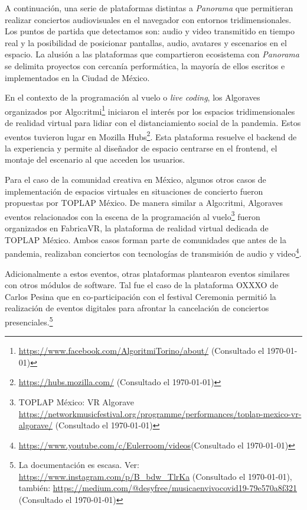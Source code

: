 

A continuación, una serie de plataformas distintas a \textit{Panorama} que permitieran realizar conciertos audiovisuales en el navegador con entornos tridimensionales. Los puntos de partida que detectamos son: audio y video transmitido en tiempo real y la posibilidad de posicionar pantallas, audio, avatares y escenarios en el espacio. La alusión a las plataformas que compartieron ecosistema con \textit{Panorama} se delimita proyectos con cercanía performática, la mayoría de ellos escritos e implementados en la Ciudad de México. 

En el contexto de la programación al vuelo o \textit{live coding}, los Algoraves organizados por Algo:ritmi\footnote{\url{https://www.facebook.com/AlgoritmiTorino/about/} (Consultado el \today)} iniciaron el interés por los espacios tridimensionales de realidad virtual para lidiar con el distanciamiento social de la pandemia. Estos eventos tuvieron lugar en Mozilla Hubs\footnote{\url{https://hubs.mozilla.com/} (Consultado el \today)}. Esta plataforma resuelve el backend de la experiencia y permite al diseñador de espacio centrarse en el frontend, el montaje del escenario al que acceden los usuarios.


Para el caso de la comunidad creativa en México, algunos otros casos de implementación de espacios virtuales en situaciones de concierto fueron propuestas por TOPLAP México. De manera similar a Algo:ritmi, Algoraves eventos relacionados con la escena de la programación al vuelo\footnote{TOPLAP México: VR Algorave \url{https://networkmusicfestival.org/programme/performances/toplap-mexico-vr-algorave/} (Consultado el \today)} fueron organizados en FabricaVR, la plataforma de realidad virtual dedicada de TOPLAP México. Ambos casos forman parte de comunidades que antes de la pandemia, realizaban conciertos con tecnologías de transmisión de audio y video\footnote{\url{https://www.youtube.com/c/Eulerroom/videos}(Consultado el \today)}.%

Adicionalmente a estos eventos, otras plataformas plantearon eventos similares con otros módulos de software. Tal fue el caso de la plataforma OXXXO de Carlos Pesina que en co-participación con el festival Ceremonia permitió la realización de eventos digitales para afrontar la cancelación de conciertos presenciales.\footnote{La documentación es escasa. Ver: \url{https://www.instagram.com/p/B_bdw_TlrKa} (Consultado el \today), también: \url{https://medium.com/@desyfree/musicaenvivocovid19-79e570a8f321} (Consultado el \today)}

